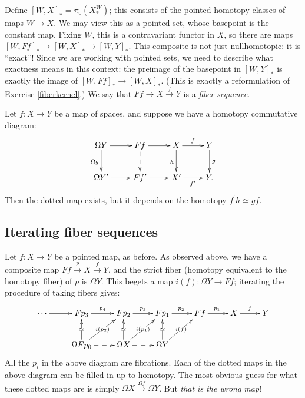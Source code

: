 Define $[W,X]_\ast = \pi_0(X^W_\ast)$; this consists of the pointed homotopy classes of maps $W\to X$.
We may view this as a pointed set, whose basepoint is the constant map.
Fixing $W$, this is a contravariant functor in $X$, so there are maps $[W,Ff]_\ast\to [W,X]_\ast\to [W,Y]_\ast$.
This composite is not just nullhomotopic: it is ``exact''!
Since we are working with pointed sets, we need to describe what exactness means in this context:
the preimage of the basepoint in $[W,Y]_\ast$ is exactly the image of $[W,Ff]_\ast\to [W,X]_\ast$.
(This is exactly a reformulation of Exercise \ref{fiberkernel}.)
We say that $Ff\to X\xrightarrow{f}Y$ is a \emph{fiber sequence}.

\begin{remark}
    Let $f:X\to Y$ be a map of spaces, and suppose we have a homotopy commutative diagram:
    \begin{equation*}
	\xymatrix{
	    \Omega Y\ar[d]_{\Omega g}\ar[r] & Ff\ar@{-->}[d]\ar[r] & X\ar[d]_{h}\ar[r]^f & Y\ar[d]^g\\
	    \Omega Y^\prime\ar[r] & Ff^\prime\ar[r] & X^\prime\ar[r]_{f^\prime} & Y.
	    }
    \end{equation*}
    Then the dotted map exists, but it {depends on the homotopy} $f^\prime h\simeq gf$. 
\end{remark}

\subsection{Iterating fiber sequences}
Let $f:X\to Y$ be a pointed map, as before.
As observed above, we have a composite map $Ff\xrightarrow{p} X\xrightarrow{f} Y$, and
the strict fiber (homotopy equivalent to the homotopy fiber) of $p$ is $\Omega Y$.
This begets a map $i(f):\Omega Y\to Ff$; iterating the procedure of taking fibers gives:
\begin{equation*}
    \xymatrix{
	\cdots\ar[r] & Fp_3 \ar[r]^{p_4} & Fp_2\ar[r]^{p_3} & Fp_1\ar[r]^{p_2} & Ff\ar[r]^{p_1} & X\ar[r]^{f} & Y\\
	& \Omega Fp_0\ar[u]|{\simeq}\ar[ur]|{i(p_2)}\ar@{-->}[r] & \Omega X\ar@{-->}[r]\ar[u]|{\simeq}\ar[ur]|{i(p_1)} & \Omega Y\ar[u]|\simeq \ar[ur]|{i(f)} & &
    }
\end{equation*}
All the $p_i$ in the above diagram are fibrations.
Each of the dotted maps in the above diagram can be filled in up to homotopy.
The most obvious guess for what these dotted maps are is simply $\Omega X\xrightarrow{\Omega f}\Omega Y$.
But \emph{that is the wrong map}!

